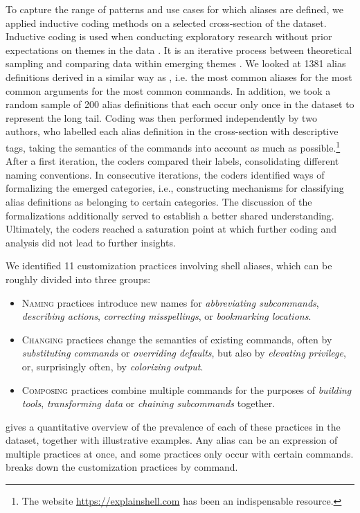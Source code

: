 To capture the range of patterns and use cases for which aliases are defined, we applied inductive coding methods on a selected cross-section of the dataset.
Inductive coding is used when conducting exploratory research without prior expectations on themes in the data \cite{thomas:06}.
It is an iterative process between theoretical sampling and comparing data within emerging themes \cite{dey:03}.
We looked at 1381 alias definitions derived in a similar way as , i.e. the most common aliases for the most common arguments for the most common commands.
In addition, we took a random sample of 200 alias definitions that each occur only once in the dataset to represent the long tail.
Coding was then performed independently by two authors, who labelled each alias definition in the cross-section with descriptive tags, taking the semantics of the commands into account as much as possible.\footnote{The website \url{https://explainshell.com} has been an indispensable resource.}
After a first iteration, the coders compared their labels, consolidating different naming conventions.
In consecutive iterations, the coders identified ways of formalizing the emerged categories, i.e., constructing mechanisms for classifying alias definitions as belonging to certain categories.
The discussion of the formalizations additionally served to establish a better shared understanding.
Ultimately, the coders reached a saturation point at which further coding and analysis did not lead to further insights.

We identified 11 customization practices involving shell aliases, which can be roughly divided into three groups:
\begin{itemize}
    \item \textsc{Naming} practices introduce new names for \emph{abbreviating subcommands}, \emph{describing actions}, \emph{correcting misspellings}, or \emph{bookmarking locations}.
    \item \textsc{Changing} practices change the semantics of existing commands, often by \emph{substituting commands} or \emph{overriding defaults}, but also by \emph{elevating privilege}, or, surprisingly often, by \emph{colorizing output}.    
    \item \textsc{Composing} practices combine multiple commands for the purposes of \emph{building tools}, \emph{transforming data} or \emph{chaining subcommands} together.
\end{itemize} 

 gives a quantitative overview of the prevalence of each of these practices in the dataset, together with illustrative examples.
Any alias can be an expression of multiple practices at once, and some practices only occur with certain commands.
 breaks down the customization practices by command.

